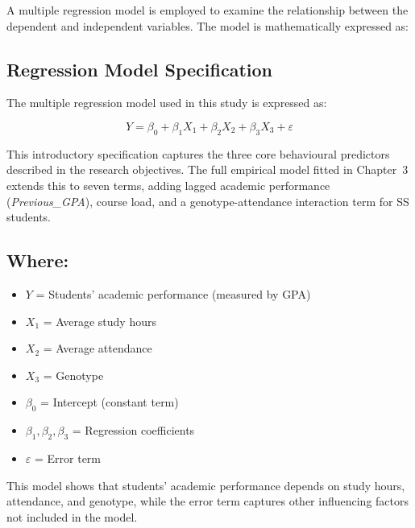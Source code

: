 \documentclass[12pt]{report}
\begin{document}
	A multiple regression model is employed to examine the relationship between the dependent and independent variables. The model is mathematically expressed as:
	\subsection{Regression Model Specification}
	
	The multiple regression model used in this study is expressed as:
	
	\begin{equation}
		Y = \beta_0 + \beta_1 X_1 + \beta_2 X_2 + \beta_3 X_3 + \varepsilon
	\end{equation}
	
	This introductory specification captures the three core behavioural
	predictors described in the research objectives. The full empirical
	model fitted in Chapter~3 extends this to seven terms, adding lagged
	academic performance (\textit{Previous\_GPA}), course load, and a
	genotype-attendance interaction term for SS students.
	
	\subsection*{Where:}
	
	\begin{itemize}
		\item $Y$ = Students’ academic performance (measured by GPA)
		\item $X_1$ = Average study hours
		\item $X_2$ = Average attendance
		\item $X_3$ = Genotype
		\item $\beta_0$ = Intercept (constant term)
		\item $\beta_1, \beta_2, \beta_3$ = Regression coefficients
		\item $\varepsilon$ = Error term
	\end{itemize}
	
	This model shows that students’ academic performance depends on study hours, attendance, and genotype, while the error term captures other influencing factors not included in the model.
	
\end{document}
